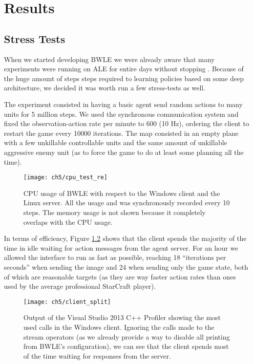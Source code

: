 \chapter{Results}

\section{Stress Tests}

When we started developing BWLE we were already aware that many experiments were
running on ALE for entire days without stopping \citep{mnih2015human}. Because
of the huge amount of steps steps required to learning policies based on some
deep architecture, we decided it was worth run a few stress-tests as well. 

The experiment consisted in having a basic agent send random actions to many
units for 5 million steps. We used the synchronous communication system and
fixed the observation-action rate per minute to 600 (10 Hz), ordering the client
to restart the game every 10000 iterations. The map consisted in an empty plane
with a few unkillable controllable units and the same amount of unkillable
aggressive enemy unit (as to force the game to do at least some planning all the
time).

\begin{figure}[h]
    \centering
    \texttt{[image: ch5/cpu\_test\_re]}
    \caption{CPU usage of BWLE with respect to the Windows client and the Linux
      server. All the usage and was synchronously recorded every 10 steps. The
      memory usage is not shown because it completely overlaps with the CPU
      usage.}
    \label{fig:fst_usage}
\end{figure}

In terms of efficiency, Figure \ref{fig:tree} shows that the client spends the
majority of the time in idle waiting for action messages from the agent server.
For an hour we allowed the interface to run as fast as possible, reaching 18
``iterations per seconds'' when sending the image and 24 when sending only the
game state, both of which are reasonable targets (as they are way faster action
rates than ones used by the average professional StarCraft player).

\begin{figure}[h]
    \centering
    \texttt{[image: ch5/client\_split]}
    \caption{Output of the Visual Studio 2013 C++ Profiler showing the most used
      calls in the Windows client. Ignoring the calls made to the stream
      operators (as we already provide a way to disable all printing from BWLE's
      configuration), we can see that the client spends most of the time waiting
      for responses from the server.} 
    \label{fig:tree}
\end{figure}


